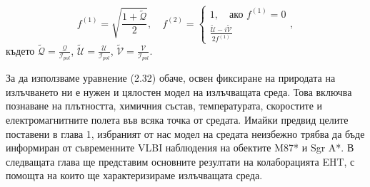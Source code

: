 \begin{equation}
	f^{(1)} = \sqrt{\frac{1 + \tilde{\mathcal{Q}}}{2}}, \quad f^{(2)} = \begin{cases}
		1,\quad \text{ако}\,\,f^{(1)} = 0 \\
		\frac{\tilde{\mathcal{U}} - i\tilde{\mathcal{V}}}{2f^{(1)}}
	\end{cases},
\end{equation}
където $\tilde{\mathcal{Q}} = \frac{\mathcal{Q}}{\mathcal{I}_{pol}}$, $\tilde{\mathcal{U}} = \frac{\mathcal{U}}{\mathcal{I}_{pol}}$, $\tilde{\mathcal{V}} = \frac{\mathcal{V}}{\mathcal{I}_{pol}}$.\\

За да използваме уравнение (2.32) обаче, освен фиксиране на природата на излъчването ни е нужен и цялостен модел на излъчващата среда. Това включва познаване на плътността, химичния състав, температурата, скоростите и електромагнитните полета във всяка точка от средата. Имайки предвид целите поставени в глава 1, избраният от нас модел на средата неизбежно трябва да бъде информиран от съвременните VLBI наблюдения на обектите M87* и Sgr A*. В следващата глава ще представим основните резултати на колаборацията EHT, с помощта на които ще характеризираме излъчващата среда.
\lfoot{}

